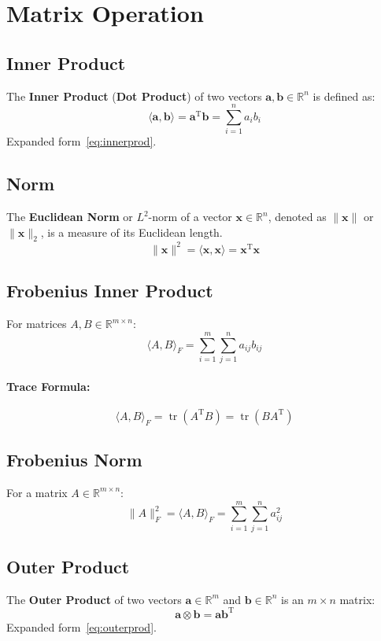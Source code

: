 \documentclass{article}
\begin{document}
\newpage
\section{Matrix Operation}

\subsection{Inner Product}
The \textbf{Inner Product} (\textbf{Dot Product}) of two vectors $\mathbf{a}, \mathbf{b} \in \mathbb{R}^n$ is defined as:
\[
    \langle \mathbf{a}, \mathbf{b} \rangle = \mathbf{a}^{\mathrm{T}} \mathbf{b} = \sum_{i=1}^n a_i b_i
\]
Expanded form~\ref{eq:innerprod}.

\subsection{Norm}
The \textbf{Euclidean Norm} or $L^2$-norm of a vector $\mathbf{x} \in \mathbb{R}^n$, denoted as $\|\mathbf{x}\|$ or $\|\mathbf{x}\|_2$, is a measure of its Euclidean length.
\[
    \|\mathbf{x}\|^2 = \langle \mathbf{x}, \mathbf{x} \rangle = \mathbf{x}^{\mathrm{T}} \mathbf{x}
\]

\subsection{Frobenius Inner Product}
For matrices $A, B \in \mathbb{R}^{m \times n}$:
\[
    \langle A, B \rangle_F = \sum_{i=1}^{m} \sum_{j=1}^{n} a_{ij} b_{ij}
\]
\paragraph{Trace Formula:}
\[
    \langle A, B \rangle_F = \operatorname{tr}(A^{\mathrm{T}} B) = \operatorname{tr}(B A^{\mathrm{T}})
\]

\subsection{Frobenius Norm}
For a matrix $A \in \mathbb{R}^{m \times n}$:
\[
    \|A\|^2_F = \langle A, B \rangle_F = \sum_{i=1}^m \sum_{j=1}^n a_{ij}^2
\]

\subsection{Outer Product}
The \textbf{Outer Product} of two vectors $\mathbf{a} \in \mathbb{R}^m$ and $\mathbf{b} \in \mathbb{R}^n$ is an $m \times n$ matrix:
\[
    \mathbf{a} \otimes \mathbf{b} = \mathbf{a} \mathbf{b}^{\mathrm{T}}
\]
Expanded form~\ref{eq:outerprod}.
\end{document}
